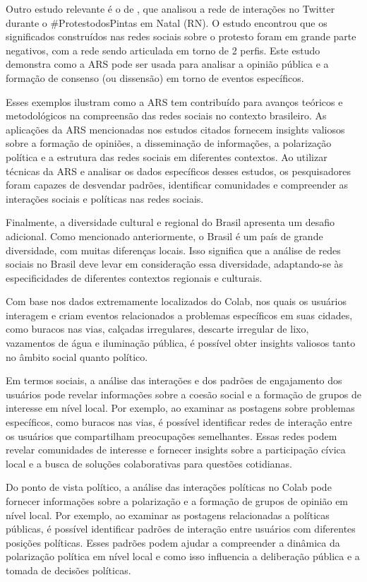 Outro estudo relevante é o de , que analisou a rede de interações no Twitter durante o \#ProtestodosPintas em Natal (RN). O estudo encontrou que os significados construídos nas redes sociais sobre o protesto foram em grande parte negativos, com a rede sendo articulada em torno de 2 perfis. Este estudo demonstra como a ARS pode ser usada para analisar a opinião pública e a formação de consenso (ou dissensão) em torno de eventos específicos.

Esses exemplos ilustram como a ARS tem contribuído para avanços teóricos e metodológicos na compreensão das redes sociais no contexto brasileiro. As aplicações da ARS mencionadas nos estudos citados fornecem insights valiosos sobre a formação de opiniões, a disseminação de informações, a polarização política e a estrutura das redes sociais em diferentes contextos. Ao utilizar técnicas da ARS e analisar os dados específicos desses estudos, os pesquisadores foram capazes de desvendar padrões, identificar comunidades e compreender as interações sociais e políticas nas redes sociais.

Finalmente, a diversidade cultural e regional do Brasil apresenta um desafio adicional. Como mencionado anteriormente, o Brasil é um país de grande diversidade, com muitas diferenças locais. Isso significa que a análise de redes sociais no Brasil deve levar em consideração essa diversidade, adaptando-se às especificidades de diferentes contextos regionais e culturais.

Com base nos dados extremamente localizados do Colab, nos quais os usuários interagem e criam eventos relacionados a problemas específicos em suas cidades, como buracos nas vias, calçadas irregulares, descarte irregular de lixo, vazamentos de água e iluminação pública, é possível obter insights valiosos tanto no âmbito social quanto político.

Em termos sociais, a análise das interações e dos padrões de engajamento dos usuários pode revelar informações sobre a coesão social e a formação de grupos de interesse em nível local. Por exemplo, ao examinar as postagens sobre problemas específicos, como buracos nas vias, é possível identificar redes de interação entre os usuários que compartilham preocupações semelhantes. Essas redes podem revelar comunidades de interesse e fornecer insights sobre a participação cívica local e a busca de soluções colaborativas para questões cotidianas.

Do ponto de vista político, a análise das interações políticas no Colab pode fornecer informações sobre a polarização e a formação de grupos de opinião em nível local. Por exemplo, ao examinar as postagens relacionadas a políticas públicas, é possível identificar padrões de interação entre usuários com diferentes posições políticas. Esses padrões podem ajudar a compreender a dinâmica da polarização política em nível local e como isso influencia a deliberação pública e a tomada de decisões políticas.

